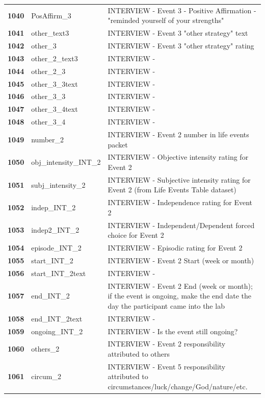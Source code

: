 \documentclass[
  letterpaper,
  DIV=11,
  numbers=noendperiod]{scrartcl}
\begin{document}
\begin{longtable}[t]{>{}cll}
\textbf{1040} & PosAffirm\_3 & INTERVIEW - Event 3 - Positive Affirmation - "reminded yourself of your strengths"\\
\addlinespace
\textbf{1041} & other\_text3 & INTERVIEW - Event 3 "other strategy" text\\
\textbf{1042} & other\_3 & INTERVIEW - Event 3 "other strategy" rating\\
\textbf{1043} & other\_2\_text3 & INTERVIEW -\\
\textbf{1044} & other\_2\_3 & INTERVIEW -\\
\textbf{1045} & other\_3\_3text & INTERVIEW -\\
\addlinespace
\textbf{1046} & other\_3\_3 & INTERVIEW -\\
\textbf{1047} & other\_3\_4text & INTERVIEW -\\
\textbf{1048} & other\_3\_4 & INTERVIEW -\\
\textbf{1049} & number\_2 & INTERVIEW - Event 2 number in life events packet\\
\textbf{1050} & obj\_intensity\_INT\_2 & INTERVIEW - Objective intensity rating for Event 2\\
\addlinespace
\textbf{1051} & subj\_intensity\_2 & INTERVIEW - Subjective intensity rating for Event 2 (from Life Events Table dataset)\\
\textbf{1052} & indep\_INT\_2 & INTERVIEW - Independence rating for Event 2\\
\textbf{1053} & indep2\_INT\_2 & INTERVIEW - Independent/Dependent forced choice for Event 2\\
\textbf{1054} & episode\_INT\_2 & INTERVIEW - Episodic rating for Event 2\\
\textbf{1055} & start\_INT\_2 & INTERVIEW - Event 2 Start (week or month)\\
\addlinespace
\textbf{1056} & start\_INT\_2text & INTERVIEW -\\
\textbf{1057} & end\_INT\_2 & INTERVIEW - Event 2 End (week or month); if the event is ongoing, make the end date the day the participant came into the lab\\
\textbf{1058} & end\_INT\_2text & INTERVIEW -\\
\textbf{1059} & ongoing\_INT\_2 & INTERVIEW - Is the event still ongoing?\\
\textbf{1060} & others\_2 & INTERVIEW - Event 2 responsibility attributed to others\\
\addlinespace
\textbf{1061} & circum\_2 & INTERVIEW - Event 5 responsibility attributed to circumstances/luck/change/God/nature/etc.\\

\end{longtable}
\end{document}
